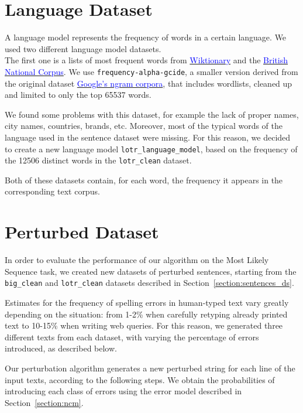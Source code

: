 \section{Language Dataset}
A language model represents the frequency of words in a certain language.
We used two different language model datasets. \\
The first one is a lists of most frequent words from 
\href{https://en.wiktionary.org/wiki/Wiktionary:Frequency_lists}{\textcolor{blue}{Wiktionary}} and the 
	\href{http://www.kilgarriff.co.uk/bnc-readme.html}{\textcolor{blue}{British National Corpus}}. 
We use \texttt{frequency-alpha-gcide}, a smaller version derived from the original dataset 
\href{https://books.google.com/ngrams/}{\textcolor{blue}{Google's ngram corpora}}, that includes wordlists, 
cleaned up and limited to only the top \num{65537} words.

We found some problems with this dataset, for example the lack of proper names, city names, countries, brands, 
etc. Moreover, most of the typical words of the language used in the sentence dataset were missing.
For this reason, we decided to create a new language model \texttt{lotr\_language\_model}, based on the 
frequency of the \num{12506} distinct words in the \texttt{lotr\_clean} dataset.

Both of these datasets contain, for each word, the frequency it appears in the corresponding text corpus.

\section{Perturbed Dataset}
\label{section:perturbed}
In order to evaluate the performance of our algorithm on the Most Likely Sequence task, we created new datasets of 
perturbed sentences, starting from the \texttt{big\_clean} and \texttt{lotr\_clean} datasets described in 
Section~\ref{section:sentences_ds}.

Estimates for the frequency of spelling errors in human-typed text vary greatly depending on the situation: from 1-2\% 
when carefully retyping already printed text to 10-15\% when writing web queries. For this reason, we generated three 
different texts from each dataset, with varying the percentage of errors introduced, as described below.

Our perturbation algorithm generates a new perturbed string for each line of the input texts, according to the 
following steps. We obtain the probabilities of introducing each class of errors using the error model described in  
Section~\ref{section:ncm}.

